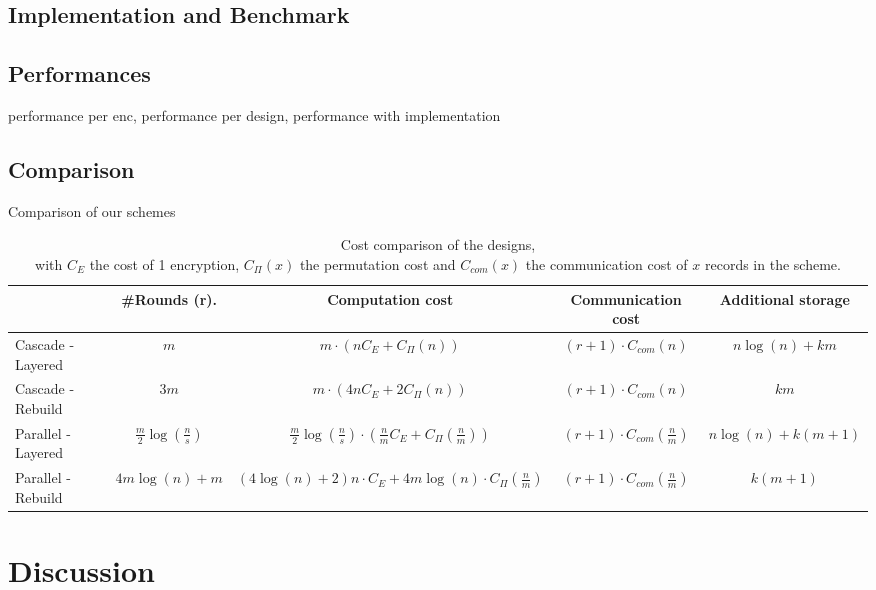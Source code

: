 \documentclass[USenglish,oneside,twocolumn]{article}
\begin{document}
\subsection{Implementation and Benchmark}\label{Implementation}
\subsection{Performances}\label{Performance}
performance per enc, performance per design, performance with implementation
\subsection{Comparison}\label{Comparison}
Comparison of our schemes

\begin{table}
\vspace{0pt}
\centering
\begin{tabular}{l *4c}
\toprule
    					& \#Rounds (r).	 			& Computation cost							& Communication cost						& Additional  storage\\
\midrule
Cascade - Layered   &  $m$ 				& $m \cdot ( n  C_{E}+ C_{\Pi}(n) )$   						& $(r+1) \cdot C_{com}(n)$  					&$n\log(n)+ k m$\\
Cascade - Rebuild   &  $3m$ 				& $m  \cdot ( 4 n  C_{E}+ 2 C_{\Pi}(n)) $  						& $(r+1) \cdot C_{com}(n)$  					&$km$\\
Parallel - Layered  &  $\frac{m}{2} \log\left( \frac{n}{s}\right)$  & $\frac{m}{2} \log\left (\frac{n}{s}\right) \cdot (\frac{n}{m} C_{E} + C_{\Pi}\left(\frac{n}{m}\right) )$   			& $(r+1) \cdot C_{com}\left(\frac{n}{m}\right)$  	&$n \log(n) + k (m+1)$\\
Parallel - Rebuild  &  $4m\log(n) +  m$  	& $(4\log(n) + 2) n \cdot C_{E} + 4m\log(n) \cdot C_{\Pi}\left(\frac{n}{m}\right)$   	& $(r+1) \cdot C_{com}\left(\frac{n}{m}\right)$  	&$k (m+1)$\\
\bottomrule
\end{tabular}
\centering
\caption{Cost comparison of the designs, \\ with $C_{E}$ the cost of 1 encryption, $C_{\Pi}(x)$ the permutation cost and $C_{com}(x)$ the communication cost of $x$ records in the scheme.}
\end{table}


\section{Discussion}\label{Discussion}
\end{document}
